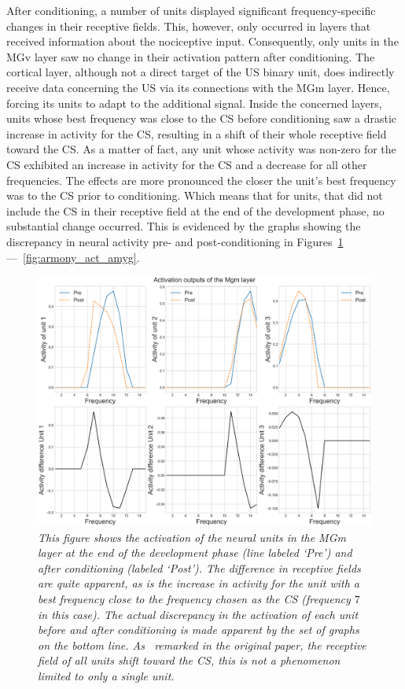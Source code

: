After conditioning, a number of units displayed significant frequency-specific changes in their receptive fields. This, however, only occurred in layers that received information about the nociceptive input. Consequently, only units in the MGv layer saw no change in their activation pattern after conditioning. The cortical layer, although not a direct target of the US binary unit, does indirectly receive data concerning the US via its connections with the MGm layer. Hence, forcing its units to adapt to the additional signal. Inside the concerned layers, units whose best frequency was close to the CS before conditioning saw a drastic increase in activity for the CS, resulting in a shift of their whole receptive field toward the CS\@. As a matter of fact, any unit whose activity was non-zero for the CS exhibited an increase in activity for the CS and a decrease for all other frequencies. The effects are more pronounced the closer the unit's best frequency was to the CS prior to conditioning. Which means that for units, that did not include the CS in their receptive field at the end of the development phase, no substantial change occurred. This is evidenced by the graphs showing the discrepancy in neural activity pre- and post-conditioning in Figures~\ref{fig:armony_act_mgm} ---~\ref{fig:armony_act_amyg}.\\
\begin{figure}[!htbp]
   \begin{center}
      \includegraphics[width=\textwidth]{Figs/activation_mgm}
      \caption{\textit{This figure shows the activation of the neural units in the MGm layer at the end of the development phase (line labeled `\emph{Pre}') and after conditioning (labeled `\emph{Post}'). The difference in receptive fields are quite apparent, as is the increase in activity for the unit with a best frequency close to the frequency chosen as the CS (frequency $7$ in this case). The actual discrepancy in the activation of each unit before and after conditioning is made apparent by the set of graphs on the bottom line. As~\citet{Armony1995} remarked in the original paper, the receptive field of all units shift toward the CS, this is not a phenomenon limited to only a single unit.}}\label{fig:armony_act_mgm}
   \end{center}
\end{figure}

